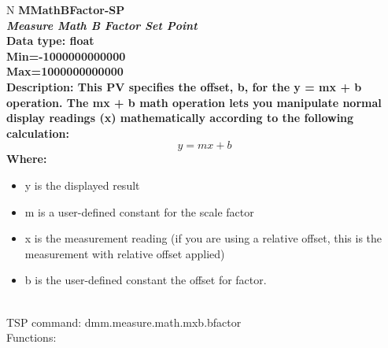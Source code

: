 \documentclass[openany]{article}
\begin{document}
		\begin{tabular}{N}
			\hline
			\bfseries MMathBFactor-SP\label{pv:mmathbfactor-sp} \\ \hline
			\emph{Measure Math B Factor Set Point} \\
			Data type: float \\
			Min=-1000000000000 \\
			Max=1000000000000 \\
			Description: This PV specifies the offset, b, for the y = mx + b operation. The mx + b math operation lets you manipulate normal display readings (x) mathematically according to the following calculation: $$y = mx + b$$ Where: \begin{itemize} \item y is the displayed result \item[] m is a user-defined constant for the scale factor \item x is the measurement reading (if you are using a relative offset, this is the measurement with relative offset applied) \item b is the user-defined constant the offset for factor. \end{itemize} \\
			TSP command: dmm.measure.math.mxb.bfactor \\
			Functions: \\
			\arrayrulecolor{\FuncTableBorderColor}

		\end{tabular}
\end{document}
